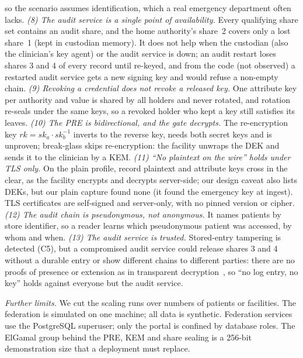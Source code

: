 so the scenario assumes identification, which a real emergency department
often lacks. %
\textit{(8) The audit service is a single point of availability.} Every
qualifying share set contains an audit share, and the home authority's
share~2 covers only a lost share~1 (kept in custodian
memory). %
It does not help when the custodian (also the clinician's key agent) or the
audit service is down; an audit restart loses shares 3 and 4 of every record
until re-keyed, and from the code (not observed) a restarted audit service
gets a new signing key and would refuse a non-empty
chain. %
\textit{(9) Revoking a credential does not revoke a released key.} One
attribute key per authority and value is shared by all holders and never
rotated, and rotation re-seals under the same keys, so a revoked holder who
kept a key still satisfies its leaves. %
\textit{(10) The PRE is bidirectional, and the gate decrypts.}
The re-encryption key $rk = sk_a \cdot sk_b^{-1}$ inverts to the reverse key,
needs both secret keys and is unproven; break-glass skips re-encryption: the
facility unwraps the DEK and sends it to the clinician by a KEM. %
\textit{(11) ``No plaintext on the wire'' holds under TLS only.} On the
plain profile, record plaintext and attribute keys cross in the clear, as
the facility encrypts and decrypts server-side; our design caveat also lists
DEKs, but our plain capture found none (it found the emergency key at
ingest). %
TLS certificates are self-signed and server-only, with no pinned version or
cipher. %
\textit{(12) The audit chain is pseudonymous, not anonymous.} It names
patients by store identifier, so a reader learns which pseudonymous patient
was accessed, by whom and when. %
\textit{(13) The audit service is trusted.} Stored-entry tampering is
detected (C5), but a compromised audit service could release shares 3 and 4
without a durable entry or show different chains to different parties: there
are no proofs of presence or extension as in transparent
decryption~\cite{ryan2017accountable,cheval2023transparency}, so ``no log
entry, no key'' holds against everyone but the audit
service. %

\textit{Further limits.} We cut the scaling runs over numbers of
patients or facilities. %
The federation is simulated on one machine; all data is synthetic. %
Federation services use the PostgreSQL superuser; only the portal is
confined by database roles. %
The ElGamal group behind the PRE, KEM and share sealing is a 256-bit
demonstration size that a deployment must replace. %
